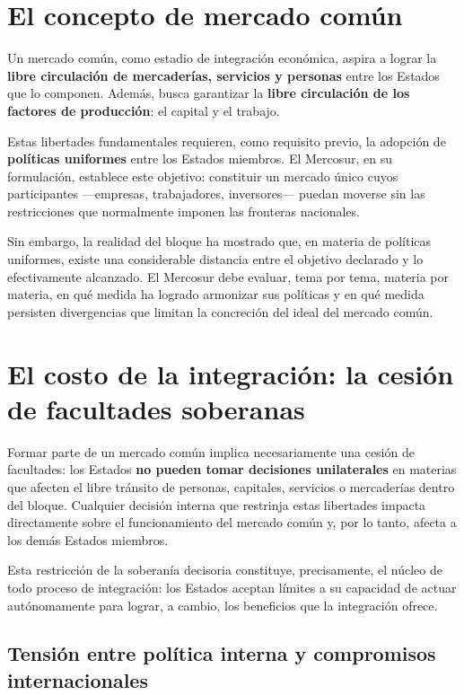 \documentclass[12pt,oneside]{book}
\begin{document}
\section{El concepto de mercado común}

Un mercado común, como estadio de integración económica, aspira a lograr la \textbf{libre circulación de mercaderías, servicios y personas} entre los Estados que lo componen. Además, busca garantizar la \textbf{libre circulación de los factores de producción}: el capital y el trabajo.

Estas libertades fundamentales requieren, como requisito previo, la adopción de \textbf{políticas uniformes} entre los Estados miembros. El Mercosur, en su formulación, establece este objetivo: constituir un mercado único cuyos participantes —empresas, trabajadores, inversores— puedan moverse sin las restricciones que normalmente imponen las fronteras nacionales.

Sin embargo, la realidad del bloque ha mostrado que, en materia de políticas uniformes, existe una considerable distancia entre el objetivo declarado y lo efectivamente alcanzado. El Mercosur debe evaluar, tema por tema, materia por materia, en qué medida ha logrado armonizar sus políticas y en qué medida persisten divergencias que limitan la concreción del ideal del mercado común.

\section{El costo de la integración: la cesión de facultades soberanas}

Formar parte de un mercado común implica necesariamente una cesión de facultades: los Estados \textbf{no pueden tomar decisiones unilaterales} en materias que afecten el libre tránsito de personas, capitales, servicios o mercaderías dentro del bloque. Cualquier decisión interna que restrinja estas libertades impacta directamente sobre el funcionamiento del mercado común y, por lo tanto, afecta a los demás Estados miembros.

Esta restricción de la soberanía decisoria constituye, precisamente, el núcleo de todo proceso de integración: los Estados aceptan límites a su capacidad de actuar autónomamente para lograr, a cambio, los beneficios que la integración ofrece.

\subsection{Tensión entre política interna y compromisos internacionales}
\end{document}
